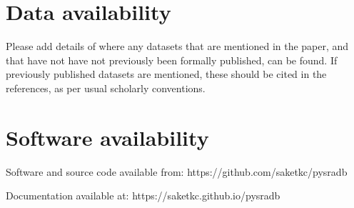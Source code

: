 \documentclass[9pt,a4paper]{extarticle}
\begin{document}
\begin{comment}

\section*{Discussion} %
This section is only required if the paper includes novel data or analyses, and 
should be written in the same style as a traditional discussion section. Please 
include a brief discussion of allowances made (if any) for controlling bias or unwanted sources of variability, and the limitations of any novel datasets.


\section*{Conclusions} %
This section is only required if the paper includes novel data or analyses, and should be written as a traditional conclusion.

\section*{Summary} %
This section is required if the paper does not include novel data or analyses.  It allows authors to briefly summarize the key points from the article.


\end{comment}

\section*{Data availability} %
Please add details of where any datasets that are mentioned in the paper, and that have not have not previously been formally published, can be found.  If previously published datasets are mentioned, these should be cited in the references, as per usual scholarly conventions.

\section*{Software availability}
Software and source code available from: https://github.com/saketkc/pysradb

Documentation available at: https://saketkc.github.io/pysradb
\end{document}
